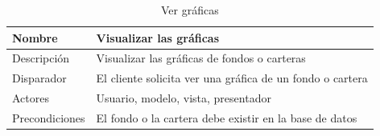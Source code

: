 \documentclass[12pt, a4paper]{book}
\begin{document}
\begin{table}[]
	\centering
	\caption{Ver gráficas}
	\label{vergraficas}
	\begin{tabular}{|l|l|}
		\hline
		Nombre            & Visualizar las gráficas                                                                                                                                                                                                                                                                                                                                                                                                                                \\ \hline
		Descripción       & Visualizar las gráficas de fondos o carteras                                                                                                                                                                                                                                                                                                                                                                                                           \\ \hline
		Disparador        & El cliente solicita ver una gráfica de un fondo o cartera                                                                                                                                                                                                                                                                                                                                                                                              \\ \hline
		Actores           & Usuario, modelo, vista, presentador                                                                                                                                                                                                                                                                                                                                                                                                                    \\ \hline
		Precondiciones    & El fondo o la cartera debe existir en la base de datos                                                                                                                                                                                                                                                                                                                                                                                                 \\ \hline

\end{tabular}
\end{table}
\end{document}
